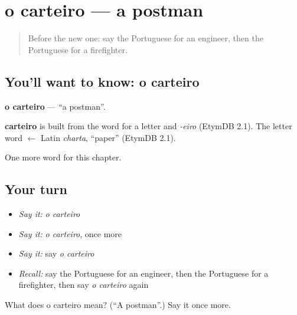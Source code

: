 \section[o carteiro]{o carteiro — a postman}

\label{lesson:PT-C111-carteiro}



\begin{quote}
Before the new one: say the Portuguese for an engineer, then the Portuguese for a firefighter.
\end{quote}

\subsection*{You'll want to know: o carteiro}
\textbf{o carteiro} — \textquotedblleft{}a postman\textquotedblright{}.

\begin{cousinweb}
\textbf{carteiro} is built from the word for a letter and \emph{-eiro} (EtymDB 2.1). The letter word $\leftarrow$ Latin \emph{charta}, \textquotedblleft{}paper\textquotedblright{} (EtymDB 2.1).
\end{cousinweb}

\begin{grammarlens}[title={What you've built}]
One more word for this chapter.
\end{grammarlens}

\subsection*{Your turn}
\begin{itemize}
\raggedright
  \item \emph{Say it:} \emph{o carteiro}
  \item \emph{Say it:} \emph{o carteiro}, once more
  \item \emph{Say it:} say \emph{o carteiro}
  \item \emph{Recall:} say the Portuguese for an engineer, then the Portuguese for a firefighter, then say \emph{o carteiro} again
\end{itemize}

\begin{tcolorbox}[breakable,colback=teal!4,colframe=teal!35!black,title={Before you move on}]
What does o carteiro mean? (\textquotedblleft{}A postman\textquotedblright{}.) Say it once more.
\end{tcolorbox}
